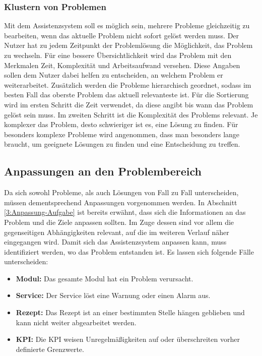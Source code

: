 \subsubsection*{Klustern von Problemen}
Mit dem Assistenzsystem soll es möglich sein, mehrere Probleme gleichzeitig zu bearbeiten, wenn das aktuelle Problem nicht sofort gelöst werden muss. Der Nutzer hat zu jedem Zeitpunkt der Problemlösung die Möglichkeit, das Problem zu wechseln. Für eine bessere Übersichtlichkeit wird das Problem mit den Merkmalen Zeit, Komplexität und Arbeitsaufwand versehen. Diese Angaben sollen dem Nutzer dabei helfen zu entscheiden, an welchem Problem er weiterarbeitet. Zusätzlich werden die Probleme hierarchisch geordnet, sodass im besten Fall das oberste Problem das aktuell relevanteste ist. Für die Sortierung wird im ersten Schritt die Zeit verwendet, da diese angibt bis wann das Problem gelöst sein muss. Im zweiten Schritt ist die Komplexität des Problems relevant. Je komplexer das Problem, desto schwieriger ist es, eine Lösung zu finden. Für besonders komplexe Probleme wird angenommen, dass man besonders lange braucht, um geeignete Lösungen zu finden und eine Entscheidung zu treffen. 

\subsection{Anpassungen an den Problembereich}
\label{4:Anpassung-Problembereich}
Da sich sowohl Probleme, als auch Lösungen von Fall zu Fall unterscheiden, müssen dementsprechend Anpassungen vorgenommen werden. In Abschnitt \ref{3:Anpassung-Aufgabe} ist bereits erwähnt, dass sich die Informationen an das Problem und die Ziele anpassen sollten. Im Zuge dessen sind vor allem die gegenseitigen Abhängigkeiten relevant, auf die im weiteren Verlauf näher eingegangen wird. Damit sich das Assistenzsystem anpassen kann, muss identifiziert werden, wo das Problem entstanden ist. Es lassen sich folgende Fälle unterscheiden:
\begin{itemize}
\item \textbf{Modul:} Das gesamte Modul hat ein Problem verursacht.
\item \textbf{Service:} Der Service löst eine Warnung oder einen Alarm aus.
\item \textbf{Rezept:} Das Rezept ist an einer bestimmten Stelle hängen geblieben und kann nicht weiter abgearbeitet werden.
\item \textbf{KPI:} Die KPI weisen Unregelmäßigkeiten auf oder überschreiten vorher definierte Grenzwerte.
\end{itemize}


